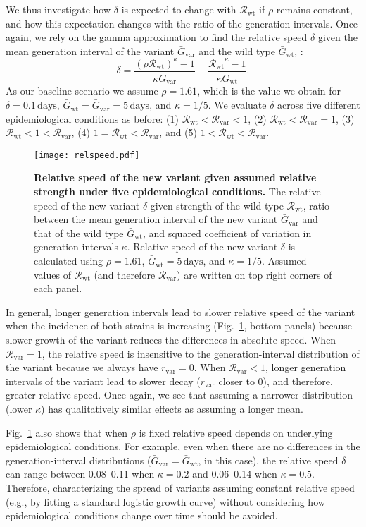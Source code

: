 \documentclass[12pt]{article}
\newcommand{\fref}[1]{Fig.~\ref{fig:#1}}
\newcommand{\vvvar}{\mathrm{var}}
\newcommand{\wwwt}{\mathrm{wt}}
\newcommand{\rx}[1]{\ensuremath{{r}_{#1}}\xspace}
\newcommand{\rv}{\rx{\vvvar}}
\newcommand{\Rx}[1]{\ensuremath{{\mathcal R}_{#1}}\xspace}
\newcommand{\Rw}{\Rx{\wwwt}}
\newcommand{\Rv}{\Rx{\vvvar}}
\newcommand{\days}{\ensuremath{\, \textrm{days}}}
\newcommand{\Gx}[1]{\ensuremath{{\bar G}_{#1}}\xspace}
\newcommand{\Gw}{\Gx{\wwwt}}
\newcommand{\Gv}{\Gx{\vvvar}}
\begin{document}
We thus investigate how $\delta$ is expected to change with \Rw if $\rho$ remains constant, and how this expectation changes with the ratio of the generation intervals. 
Once again, we rely on the gamma approximation to find the relative speed $\delta$ given the mean generation interval of the variant $\Gv$ and the wild type $\Gw$, :
\begin{equation}
\delta = \frac{(\rho \Rw)^{\kappa} - 1}{\kappa \Gv} - \frac{\Rw^{\kappa} - 1}{\kappa \Gw}.
\end{equation}
As our baseline scenario we assume $\rho = 1.61$, which is the value we obtain for $\delta=0.1\,\textrm{days}$, $\Gw = \Gv = 5\,\textrm{days}$, and $\kappa = 1/5$.
We evaluate $\delta$ across five different epidemiological conditions as before: (1) $\Rw < \Rv < 1$, (2) $\Rw < \Rv = 1$, (3) $\Rw < 1 < \Rv$, (4) $1 = \Rw < \Rv$, and (5) $1 < \Rw < \Rv$.

\begin{figure}[!th]
\texttt{[image: relspeed.pdf]}
\caption{
\textbf{Relative speed of the new variant given assumed relative strength under five epidemiological conditions.}
The relative speed of the new variant $\delta$ given strength of the wild type $\Rw$, ratio between the mean generation interval of the new variant $\Gv$ and that of the wild type $\Gw$, and squared coefficient of variation in generation intervals $\kappa$.
Relative speed of the new variant $\delta$ is calculated using $\rho=1.61$, $\Gw = 5\days$, and $\kappa = 1/5$.
Assumed values of $\Rw$ (and therefore $\Rv$) are written on top right corners of each panel.
}
\label{fig:relspeed}
\end{figure}

In general, longer generation intervals lead to slower relative speed of the variant when the incidence of both strains is increasing (\fref{relspeed}, bottom panels) because slower growth of the variant reduces the differences in absolute speed.
When $\Rv=1$, the relative speed is insensitive to the generation-interval distribution of the variant because we always have $\rv=0$.
When $\Rv<1$, longer generation intervals of the variant lead to slower decay ($\rv$ closer to 0), and therefore, greater relative speed.
Once again, we see that assuming a narrower distribution (lower $\kappa$) has qualitatively similar effects as assuming a longer mean.

\fref{relspeed} also shows that when $\rho$ is fixed relative speed depends on underlying epidemiological conditions. 
For example, even when there are no differences in the generation-interval distributions ($\Gv=\Gw$, in this case), the relative speed $\delta$ can range between 0.08--0.11 when $\kappa=0.2$ and 0.06--0.14 when $\kappa=0.5$.
Therefore, characterizing the spread of variants assuming constant relative speed (e.g., by fitting a standard logistic growth curve) without considering how epidemiological conditions change over time should be avoided.
\end{document}
